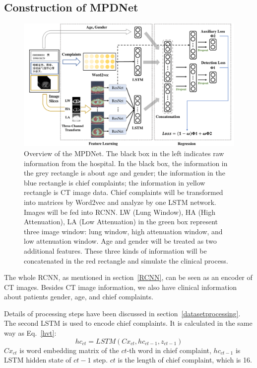 \documentclass[journal]{IEEEtran}
\begin{document}
\subsection{Construction of MPDNet}
\label{MMDDtxt}
\begin{figure}[htbp]
    \centerline{\includegraphics[width=180mm]{MPD2.pdf}}
    \vspace{-0cm}
    \caption{Overview of the MPDNet. The black box in the left indicates raw information from the hospital. In the black box, the information in the grey rectangle is about age and gender; the information in the blue rectangle is chief complaints; the information in yellow rectangle is CT image data. Chief complaints will be transformed into matrices by Word2vec and analyze by one LSTM network. Images will be fed into RCNN. LW (Lung Window), HA (High Attenuation), LA (Low Attenuation) in the green box represent three image window: lung window, high attenuation window, and low attenuation window. Age and gender will be treated as two additional features. These three kinds of information will be concatenated in the red rectangle and simulate the clinical process.}
    \vspace{-0cm}
    \label{architecture}

    \end{figure}

The whole RCNN, as mentioned in section~\ref{RCNN}, can be seen as an encoder of CT images.
Besides CT image information, we also have clinical information about patients gender, age, and chief complaints. 

Details of processing steps have been discussed in section~\ref{datasetprocessing}. The second LSTM is used to encode chief complaints. It is calculated in the same way as Eq.~\ref{hvt}:
\begin{equation}
    hc_{ct} = LSTM(Cx_{ct}, hc_{ct-1}, z_{ct-1})
    \label{hct}
\end{equation}
$Cx_{ct}$ is word embedding matrix of the $ct$-th word in chief complaint, $hc_{ct-1}$ is LSTM hidden state of $ct-1$ step. $ct$ is the length of chief complaint, which is 16. 
\end{document}
